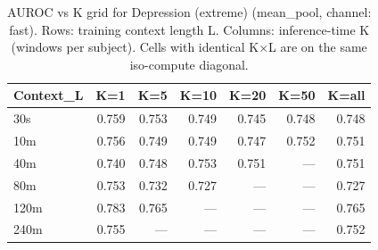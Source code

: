\begin{table}[ht]
\centering
\caption{AUROC vs K grid for Depression (extreme) (mean_pool, channel: fast). Rows: training context length L. Columns: inference-time K (windows per subject). Cells with identical K×L are on the same iso-compute diagonal.}
\label{tab:kgrid_depression_extreme_binary_mean_pool_fast}
\begin{tabular}{lrrrrrr}
\toprule
Context_L & K=1 & K=5 & K=10 & K=20 & K=50 & K=all \\
\midrule
30s & 0.759 & 0.753 & 0.749 & 0.745 & 0.748 & 0.748 \\
10m & 0.756 & 0.749 & 0.749 & 0.747 & 0.752 & 0.751 \\
40m & 0.740 & 0.748 & 0.753 & 0.751 & — & 0.751 \\
80m & 0.753 & 0.732 & 0.727 & — & — & 0.727 \\
120m & 0.783 & 0.765 & — & — & — & 0.765 \\
240m & 0.755 & — & — & — & — & 0.752 \\
\bottomrule
\end{tabular}
\end{table}